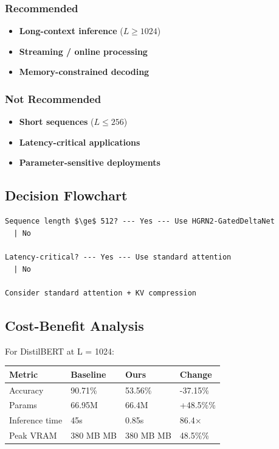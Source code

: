 \subsubsection{Recommended}
\begin{itemize}
\item \textbf{Long-context inference} ($L \geq 1024$)
\item \textbf{Streaming / online processing}
\item \textbf{Memory-constrained decoding}

\end{itemize}
\subsubsection{Not Recommended}
\begin{itemize}
\item \textbf{Short sequences} ($L \leq 256$)
\item \textbf{Latency-critical applications}
\item \textbf{Parameter-sensitive deployments}

\end{itemize}
\subsection{Decision Flowchart}

\begin{lstlisting}
Sequence length $\ge$ 512? --- Yes --- Use HGRN2-GatedDeltaNet
  | No
   
Latency-critical? --- Yes --- Use standard attention
  | No
   
Consider standard attention + KV compression
\end{lstlisting}

\subsection{Cost-Benefit Analysis}

For DistilBERT at L = 1024:

\begin{table}[H]
\centering
\small
\begin{tabular}{llll}
\toprule
\textbf{Metric} & \textbf{Baseline} & \textbf{Ours} & \textbf{Change} \\
\midrule
Accuracy & 90.71\% & 53.56\% & -37.15\% \\
Params & 66.95M & 66.4M & +48.5\%\% \\
Inference time & 45s & 0.85s & 86.4$\times$ \\
Peak VRAM & 380 MB MB & 380 MB MB & 48.5\%\% \\
\bottomrule
\end{tabular}
\end{table}

